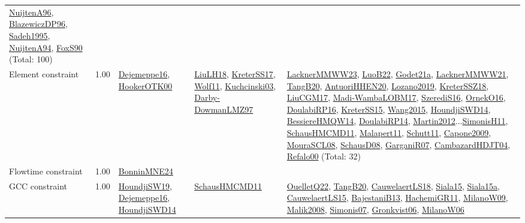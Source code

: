 {\begin{longtable}{p{3cm}r>{\raggedright\arraybackslash}p{6cm}>{\raggedright\arraybackslash}p{6cm}>{\raggedright\arraybackslash}p{8cm}}
\hyperref[detail:NuijtenA96]{NuijtenA96}, \hyperref[detail:BlazewiczDP96]{BlazewiczDP96}, \hyperref[detail:Sadeh1995]{Sadeh1995}, \hyperref[detail:NuijtenA94]{NuijtenA94}, \hyperref[detail:FoxS90]{FoxS90} (Total: 100)\\
\index{Element constraint}\index{Constraints!Element constraint}Element constraint &  1.00 & \hyperref[detail:Dejemeppe16]{Dejemeppe16}, \hyperref[detail:HookerOTK00]{HookerOTK00} & \hyperref[detail:LiuLH18]{LiuLH18}, \hyperref[detail:KreterSS17]{KreterSS17}, \hyperref[detail:Wolf11]{Wolf11}, \hyperref[detail:Kuchcinski03]{Kuchcinski03}, \hyperref[detail:Darby-DowmanLMZ97]{Darby-DowmanLMZ97} & \hyperref[detail:LacknerMMWW23]{LacknerMMWW23}, \hyperref[detail:LuoB22]{LuoB22}, \hyperref[detail:Godet21a]{Godet21a}, \hyperref[detail:LacknerMMWW21]{LacknerMMWW21}, \hyperref[detail:TangB20]{TangB20}, \hyperref[detail:AntuoriHHEN20]{AntuoriHHEN20}, \hyperref[detail:Lozano2019]{Lozano2019}, \hyperref[detail:KreterSSZ18]{KreterSSZ18}, \hyperref[detail:LiuCGM17]{LiuCGM17}, \hyperref[detail:Madi-WambaLOBM17]{Madi-WambaLOBM17}, \hyperref[detail:SzerediS16]{SzerediS16}, \hyperref[detail:OrnekO16]{OrnekO16}, \hyperref[detail:DoulabiRP16]{DoulabiRP16}, \hyperref[detail:KreterSS15]{KreterSS15}, \hyperref[detail:Wang2015]{Wang2015}, \hyperref[detail:HoundjiSWD14]{HoundjiSWD14}, \hyperref[detail:BessiereHMQW14]{BessiereHMQW14}, \hyperref[detail:DoulabiRP14]{DoulabiRP14}, \hyperref[detail:Martin2012]{Martin2012}...\hyperref[detail:SimonisH11]{SimonisH11}, \hyperref[detail:SchausHMCMD11]{SchausHMCMD11}, \hyperref[detail:Malapert11]{Malapert11}, \hyperref[detail:Schutt11]{Schutt11}, \hyperref[detail:Capone2009]{Capone2009}, \hyperref[detail:MouraSCL08]{MouraSCL08}, \hyperref[detail:SchausD08]{SchausD08}, \hyperref[detail:GarganiR07]{GarganiR07}, \hyperref[detail:CambazardHDJT04]{CambazardHDJT04}, \hyperref[detail:Refalo00]{Refalo00} (Total: 32)\\
\index{Flowtime constraint}\index{Constraints!Flowtime constraint}Flowtime constraint &  1.00 & \hyperref[detail:BonninMNE24]{BonninMNE24} &  & \\
\index{GCC constraint}\index{Constraints!GCC constraint}GCC constraint &  1.00 & \hyperref[detail:HoundjiSW19]{HoundjiSW19}, \hyperref[detail:Dejemeppe16]{Dejemeppe16}, \hyperref[detail:HoundjiSWD14]{HoundjiSWD14} & \hyperref[detail:SchausHMCMD11]{SchausHMCMD11} & \hyperref[detail:OuelletQ22]{OuelletQ22}, \hyperref[detail:TangB20]{TangB20}, \hyperref[detail:CauwelaertLS18]{CauwelaertLS18}, \hyperref[detail:Siala15]{Siala15}, \hyperref[detail:Siala15a]{Siala15a}, \hyperref[detail:CauwelaertLS15]{CauwelaertLS15}, \hyperref[detail:BajestaniB13]{BajestaniB13}, \hyperref[detail:HachemiGR11]{HachemiGR11}, \hyperref[detail:MilanoW09]{MilanoW09}, \hyperref[detail:Malik2008]{Malik2008}, \hyperref[detail:Simonis07]{Simonis07}, \hyperref[detail:Gronkvist06]{Gronkvist06}, \hyperref[detail:MilanoW06]{MilanoW06}\\

\end{longtable}}
